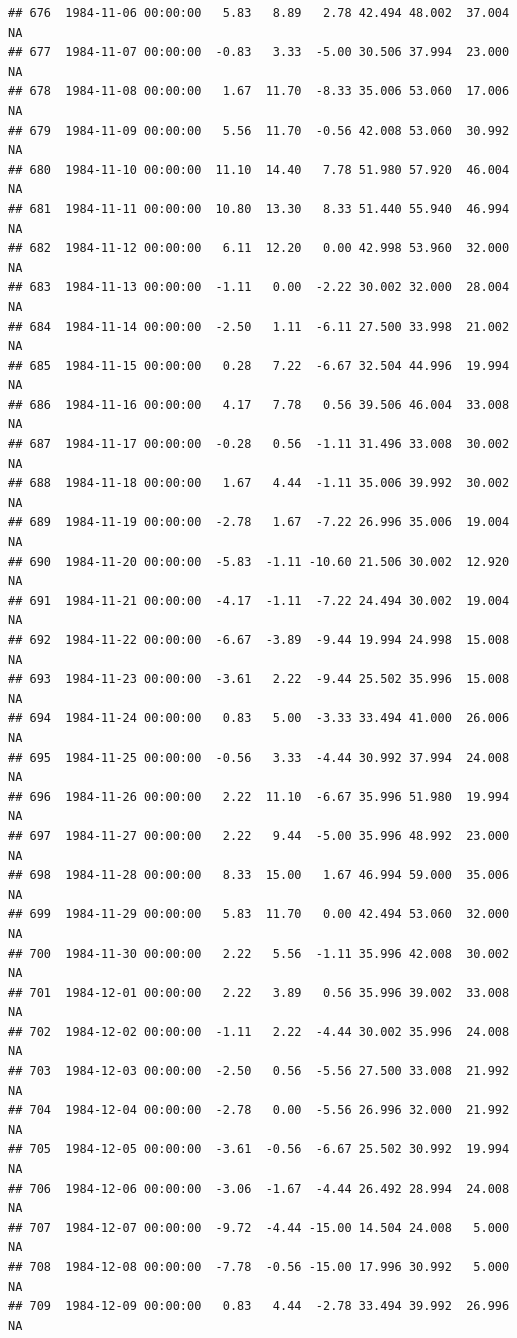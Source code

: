 \documentclass{article}\usepackage{graphicx, color}
\makeatletter
\newenvironment{kframe}{%
 \def\at@end@of@kframe{}%
 \ifinner\ifhmode%
  \def\at@end@of@kframe{\end{minipage}}%
  \begin{minipage}{\columnwidth}%
 \fi\fi%
 \def\FrameCommand##1{\hskip\@totalleftmargin \hskip-\fboxsep
 \colorbox{shadecolor}{##1}\hskip-\fboxsep
     \hskip-\linewidth \hskip-\@totalleftmargin \hskip\columnwidth}%
 \MakeFramed {\advance\hsize-\width
   \@totalleftmargin\z@ \linewidth\hsize
   \@setminipage}}%
 {\par\unskip\endMakeFramed%
 \at@end@of@kframe}
\newenvironment{knitrout}{}{} %
\makeatother
\begin{document}
\begin{knitrout}
\begin{kframe}
\begin{verbatim}
## 676  1984-11-06 00:00:00   5.83   8.89   2.78 42.494 48.002  37.004     NA
## 677  1984-11-07 00:00:00  -0.83   3.33  -5.00 30.506 37.994  23.000     NA
## 678  1984-11-08 00:00:00   1.67  11.70  -8.33 35.006 53.060  17.006     NA
## 679  1984-11-09 00:00:00   5.56  11.70  -0.56 42.008 53.060  30.992     NA
## 680  1984-11-10 00:00:00  11.10  14.40   7.78 51.980 57.920  46.004     NA
## 681  1984-11-11 00:00:00  10.80  13.30   8.33 51.440 55.940  46.994     NA
## 682  1984-11-12 00:00:00   6.11  12.20   0.00 42.998 53.960  32.000     NA
## 683  1984-11-13 00:00:00  -1.11   0.00  -2.22 30.002 32.000  28.004     NA
## 684  1984-11-14 00:00:00  -2.50   1.11  -6.11 27.500 33.998  21.002     NA
## 685  1984-11-15 00:00:00   0.28   7.22  -6.67 32.504 44.996  19.994     NA
## 686  1984-11-16 00:00:00   4.17   7.78   0.56 39.506 46.004  33.008     NA
## 687  1984-11-17 00:00:00  -0.28   0.56  -1.11 31.496 33.008  30.002     NA
## 688  1984-11-18 00:00:00   1.67   4.44  -1.11 35.006 39.992  30.002     NA
## 689  1984-11-19 00:00:00  -2.78   1.67  -7.22 26.996 35.006  19.004     NA
## 690  1984-11-20 00:00:00  -5.83  -1.11 -10.60 21.506 30.002  12.920     NA
## 691  1984-11-21 00:00:00  -4.17  -1.11  -7.22 24.494 30.002  19.004     NA
## 692  1984-11-22 00:00:00  -6.67  -3.89  -9.44 19.994 24.998  15.008     NA
## 693  1984-11-23 00:00:00  -3.61   2.22  -9.44 25.502 35.996  15.008     NA
## 694  1984-11-24 00:00:00   0.83   5.00  -3.33 33.494 41.000  26.006     NA
## 695  1984-11-25 00:00:00  -0.56   3.33  -4.44 30.992 37.994  24.008     NA
## 696  1984-11-26 00:00:00   2.22  11.10  -6.67 35.996 51.980  19.994     NA
## 697  1984-11-27 00:00:00   2.22   9.44  -5.00 35.996 48.992  23.000     NA
## 698  1984-11-28 00:00:00   8.33  15.00   1.67 46.994 59.000  35.006     NA
## 699  1984-11-29 00:00:00   5.83  11.70   0.00 42.494 53.060  32.000     NA
## 700  1984-11-30 00:00:00   2.22   5.56  -1.11 35.996 42.008  30.002     NA
## 701  1984-12-01 00:00:00   2.22   3.89   0.56 35.996 39.002  33.008     NA
## 702  1984-12-02 00:00:00  -1.11   2.22  -4.44 30.002 35.996  24.008     NA
## 703  1984-12-03 00:00:00  -2.50   0.56  -5.56 27.500 33.008  21.992     NA
## 704  1984-12-04 00:00:00  -2.78   0.00  -5.56 26.996 32.000  21.992     NA
## 705  1984-12-05 00:00:00  -3.61  -0.56  -6.67 25.502 30.992  19.994     NA
## 706  1984-12-06 00:00:00  -3.06  -1.67  -4.44 26.492 28.994  24.008     NA
## 707  1984-12-07 00:00:00  -9.72  -4.44 -15.00 14.504 24.008   5.000     NA
## 708  1984-12-08 00:00:00  -7.78  -0.56 -15.00 17.996 30.992   5.000     NA
## 709  1984-12-09 00:00:00   0.83   4.44  -2.78 33.494 39.992  26.996     NA

\end{verbatim}
\end{kframe}
\end{knitrout}
\end{document}

